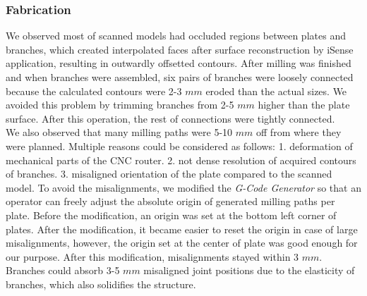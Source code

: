 \subsubsection*{Fabrication}
We observed most of scanned models had occluded regions between plates and branches, which created interpolated faces after surface reconstruction by iSense application, resulting in outwardly offsetted contours. After milling was finished and when branches were assembled, six pairs of branches were loosely connected because the calculated contours were 2-3 $mm$ eroded than the actual sizes.
We avoided this problem by trimming branches from 2-5 $mm$ higher than the plate surface.
After this operation, the rest of connections were tightly connected. \\

We also observed that many milling paths were 5-10 $mm$ off from where they were planned.
Multiple reasons could be considered as follows: 1. deformation of mechanical parts of the CNC router. 2. not dense resolution of acquired contours of branches. 3. misaligned orientation of the plate compared to the scanned model.
To avoid the misalignments, we modified the \textit{G-Code Generator} so that an operator can freely adjust the absolute origin of generated milling paths per plate.
Before the modification, an origin was set at the bottom left corner of plates.
After the modification, it became easier to reset the origin in case of large misalignments, however, the origin set at the center of plate was good enough for our purpose.
After this modification, misalignments stayed within 3 $mm$.
Branches could absorb 3-5 $mm$ misaligned joint positions due to the elasticity of branches, which also solidifies the structure.
